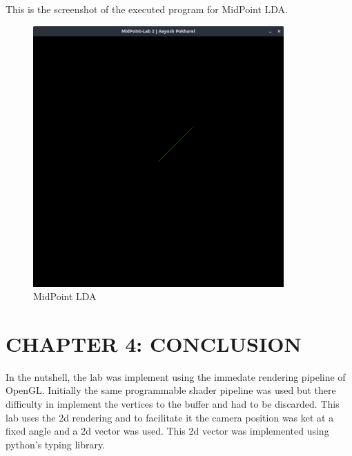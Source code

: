 \documentclass[12pt]{article}
\begin{document}
\clearpage
This is the screenshot of the executed program for MidPoint LDA.
\begin{figure}[h]
    \centerline{\includegraphics[height=100mm]{MidPoint.png}}
    \caption{MidPoint LDA}
    \label{fig}
\end{figure}

\section{CHAPTER 4: CONCLUSION}
In the nutshell, the lab was implement using the immedate rendering pipeline of OpenGL. Initially the same programmable shader pipeline was used but there
difficulty in implement the vertices to the buffer and had to be discarded. This lab uses the 2d rendering and to facilitate it the camera position was ket at a
fixed angle and a 2d vector was used. This 2d vector was implemented using python's typing library.
\clearpage
\thispagestyle{empty}
\printbibliography
\end{document}
